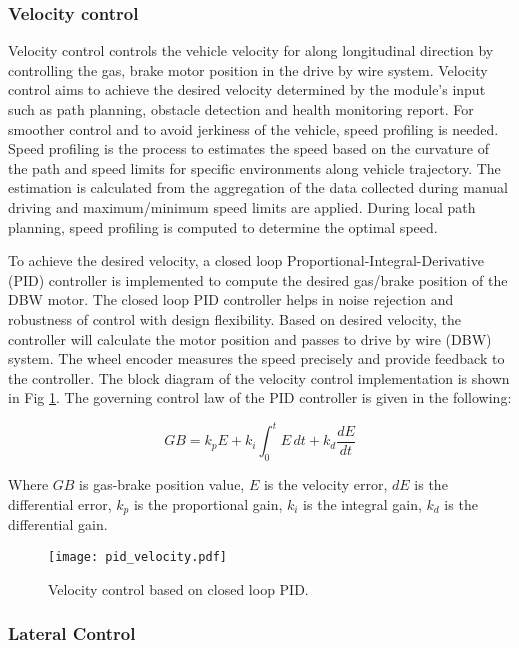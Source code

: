 \documentclass[10 pt,a4paper,conference]{IEEEtran}
\begin{document}
\subsubsection{Velocity control}\label{velocity-control}

Velocity control controls the vehicle velocity for along longitudinal
direction by controlling the gas, brake motor position in the drive by
wire system. Velocity control aims to achieve the desired velocity
determined by the module's input such as path planning, obstacle
detection and health monitoring report. For smoother control and to
avoid jerkiness of the vehicle, speed profiling is needed. Speed
profiling is the process to estimates the speed based on the curvature
of the path and speed limits for specific environments along vehicle
trajectory. The estimation is calculated from the aggregation of the
data collected during manual driving and maximum/minimum speed limits
are applied. During local path planning, speed profiling is computed to
determine the optimal speed.

To achieve the desired velocity, a closed loop
Proportional-Integral-Derivative (PID) controller is implemented to
compute the desired gas/brake position of the DBW motor. The closed loop
PID controller helps in noise rejection and robustness of control with
design flexibility. Based on desired velocity, the controller will
calculate the motor position and passes to drive by wire (DBW) system.
The wheel encoder measures the speed precisely and provide feedback to
the controller. The block diagram of the velocity control implementation
is shown in Fig \ref{fig_vel_control}. The governing control law of the
PID controller is given in the following:

\begin{equation}
\label{eqn_pid}
GB = k_p{E} + k_{i}\int_{0}^{t}{E}\,{dt} + k_{d}\frac{dE}{dt}
\end{equation}

Where $GB$ is gas-brake position value, $E$ is the velocity error, $dE$
is the differential error, $k_p$ is the proportional gain, $k_i$ is the
integral gain, $k_d$ is the differential gain.

\begin{figure}[!t]
\centering
\texttt{[image: pid\_velocity.pdf]}
\caption{Velocity control based on closed loop PID.}
\label{fig_vel_control}
\end{figure}

\subsubsection{Lateral Control}\label{lateral-control}
\end{document}
